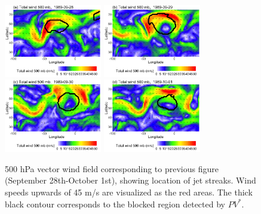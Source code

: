 \documentclass[smallextended]{svjour3}       %
\numberwithin{equation}{section}
\begin{document}
\begin{figure}
\centering
\includegraphics[width=0.38\textwidth]{fig13a}
\includegraphics[width=0.38\textwidth]{fig13b}\\
\includegraphics[width=0.38\textwidth]{fig13c}
\includegraphics[width=0.38\textwidth]{fig13d}
\caption{500 hPa vector wind field corresponding to previous figure (September 28th-October 1st), showing location of jet streaks. Wind speeds upwards of 45 m/s are visualized as the red areas. The thick black contour corresponds to the blocked region detected by $PV^*$.}\label{windfield}
\end{figure}
\end{document}
